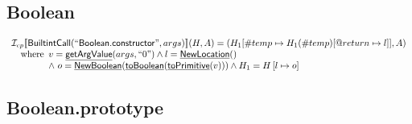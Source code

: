 \documentclass{article}
\newcommand{\SF}[1]{\mbox{\textsf{#1}}}
\newcommand{\wherec}[1]{{\rm where}\begin{array}[t]{l}#1\end{array}}
\newcommand{\I}{\mathcal{I}}
\newcommand{\lbr}{\llbracket}
\newcommand{\rbr}{\rrbracket}
\newcommand{\hf}[1]{\underline{\sf #1}}
\begin{document}
\subsection{Boolean}
\[
\begin{array}{l}
\I _{cp}\lbr \SF{BuiltintCall}(``\SF{Boolean.constructor}",args)\rbr(H,A)
  = (H_1[\#temp \mapsto H_1(\#temp)[@return \mapsto l]], A)\\
\quad\wherec{
  v = \hf{getArgValue}(args, ``0") \land l=\hf{NewLocation}()\\
  \land\ o=\hf{NewBoolean}(\hf{toBoolean}(\hf{toPrimitive}(v))) \land H_1=H\left[l\mapsto o\right]}\\


\end{array}
\]


\subsection{Boolean.prototype}
\end{document}

